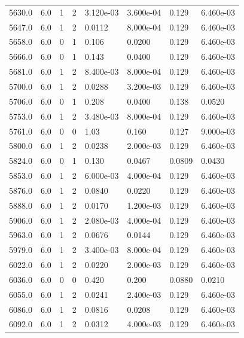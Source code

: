 \documentclass[preview]{standalone}
\begin{document}
{{{{{{\begin{tabular}{L{1.2cm}C{1.2cm} C{0.3cm}C{0.5cm} C{1.4cm}C{1.4cm} C{1.4cm}C{1.4cm}}
  5630.0  &   6.0  & 1     &  2 &  3.120e-03  & 3.600e-04  & 0.129 &  6.460e-03   \\ 
  5647.0  &   6.0  & 1     &  2 &  0.0112  & 8.000e-04  & 0.129 &  6.460e-03   \\ 
  5658.0  &   6.0  & 0     &  1 &  0.106  & 0.0200  & 0.129 &  6.460e-03   \\ 
  5666.0  &   6.0  & 0     &  1 &  0.143  & 0.0400  & 0.129 &  6.460e-03   \\ 
  5681.0  &   6.0  & 1     &  2 &  8.400e-03  & 8.000e-04  & 0.129 &  6.460e-03   \\ 
  5700.0  &   6.0  & 1     &  2 &  0.0288  & 3.200e-03  & 0.129 &  6.460e-03   \\ 
  5706.0  &   6.0  & 0     &  1 &  0.208  & 0.0400  & 0.138 &  0.0520   \\ 
  5753.0  &   6.0  & 1     &  2 &  3.480e-03  & 8.000e-04  & 0.129 &  6.460e-03   \\ 
  5761.0  &   6.0  & 0     &  0 &  1.03  & 0.160  & 0.127 &  9.000e-03   \\ 
  5800.0  &   6.0  & 1     &  2 &  0.0238  & 2.000e-03  & 0.129 &  6.460e-03   \\ 
  5824.0  &   6.0  & 0     &  1 &  0.130  & 0.0467  & 0.0809 &  0.0430   \\ 
  5853.0  &   6.0  & 1     &  2 &  6.000e-03  & 4.000e-04  & 0.129 &  6.460e-03   \\ 
  5876.0  &   6.0  & 1     &  2 &  0.0840  & 0.0220  & 0.129 &  6.460e-03   \\ 
  5888.0  &   6.0  & 1     &  2 &  0.0170  & 1.200e-03  & 0.129 &  6.460e-03   \\ 
  5906.0  &   6.0  & 1     &  2 &  2.080e-03  & 4.000e-04  & 0.129 &  6.460e-03   \\ 
  5963.0  &   6.0  & 1     &  2 &  0.0676  & 0.0144  & 0.129 &  6.460e-03   \\ 
  5979.0  &   6.0  & 1     &  2 &  3.400e-03  & 8.000e-04  & 0.129 &  6.460e-03   \\ 
  6022.0  &   6.0  & 1     &  2 &  0.0220  & 2.000e-03  & 0.129 &  6.460e-03   \\ 
  6036.0  &   6.0  & 0     &  0 &  0.420  & 0.200  & 0.0880 &  0.0210   \\ 
  6055.0  &   6.0  & 1     &  2 &  0.0241  & 2.400e-03  & 0.129 &  6.460e-03   \\ 
  6086.0  &   6.0  & 1     &  2 &  0.0816  & 0.0208  & 0.129 &  6.460e-03   \\ 
  6092.0  &   6.0  & 1     &  2 &  0.0312  & 4.000e-03  & 0.129 &  6.460e-03   \\ 

\end{tabular}}}}}}}
\end{document}
